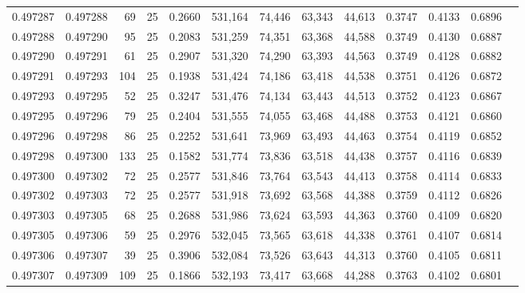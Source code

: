 \begin{tabular}{rrrrrrrrrrrrr}
0.497287 & 0.497288 &    69 &  25 &                                     0.2660 & 531,164 &  74,446 &  63,343 &  44,613 & 0.3747 & 0.4133 & 0.6896 \\
0.497288 & 0.497290 &    95 &  25 &                                     0.2083 & 531,259 &  74,351 &  63,368 &  44,588 & 0.3749 & 0.4130 & 0.6887 \\
0.497290 & 0.497291 &    61 &  25 &                                     0.2907 & 531,320 &  74,290 &  63,393 &  44,563 & 0.3749 & 0.4128 & 0.6882 \\
0.497291 & 0.497293 &   104 &  25 &                                     0.1938 & 531,424 &  74,186 &  63,418 &  44,538 & 0.3751 & 0.4126 & 0.6872 \\
0.497293 & 0.497295 &    52 &  25 &                                     0.3247 & 531,476 &  74,134 &  63,443 &  44,513 & 0.3752 & 0.4123 & 0.6867 \\
0.497295 & 0.497296 &    79 &  25 &                                     0.2404 & 531,555 &  74,055 &  63,468 &  44,488 & 0.3753 & 0.4121 & 0.6860 \\
0.497296 & 0.497298 &    86 &  25 &                                     0.2252 & 531,641 &  73,969 &  63,493 &  44,463 & 0.3754 & 0.4119 & 0.6852 \\
0.497298 & 0.497300 &   133 &  25 &                                     0.1582 & 531,774 &  73,836 &  63,518 &  44,438 & 0.3757 & 0.4116 & 0.6839 \\
0.497300 & 0.497302 &    72 &  25 &                                     0.2577 & 531,846 &  73,764 &  63,543 &  44,413 & 0.3758 & 0.4114 & 0.6833 \\
0.497302 & 0.497303 &    72 &  25 &                                     0.2577 & 531,918 &  73,692 &  63,568 &  44,388 & 0.3759 & 0.4112 & 0.6826 \\
0.497303 & 0.497305 &    68 &  25 &                                     0.2688 & 531,986 &  73,624 &  63,593 &  44,363 & 0.3760 & 0.4109 & 0.6820 \\
0.497305 & 0.497306 &    59 &  25 &                                     0.2976 & 532,045 &  73,565 &  63,618 &  44,338 & 0.3761 & 0.4107 & 0.6814 \\
0.497306 & 0.497307 &    39 &  25 &                                     0.3906 & 532,084 &  73,526 &  63,643 &  44,313 & 0.3760 & 0.4105 & 0.6811 \\
0.497307 & 0.497309 &   109 &  25 &                                     0.1866 & 532,193 &  73,417 &  63,668 &  44,288 & 0.3763 & 0.4102 & 0.6801 \\

\end{tabular}
